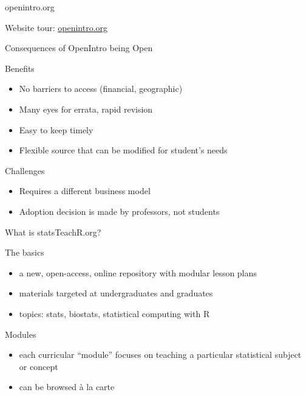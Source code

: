 
\begin{frame}{openintro.org}

Website tour: \href{http://www.openintro.org}{openintro.org}

\end{frame}


\begin{frame}{Consequences of OpenIntro being Open}
\begin{block}{Benefits}
\begin{itemize}
\item No barriers to access (financial, geographic)
\item Many eyes for errata, rapid revision
\item Easy to keep timely
\item Flexible source that can be modified for student's needs
\end{itemize}
\end{block}

\begin{block}{Challenges}
\begin{itemize}
\item Requires a different business model
\item Adoption decision is made by professors, not students
\end{itemize}
\end{block}

\end{frame}



\begin{frame}{What is statsTeachR.org?}

\begin{block}{The basics}
\begin{itemize}
        \item a new, open-access, online repository with modular lesson plans
        \item materials targeted at undergraduates and graduates 
        \item topics: stats, biostats, statistical computing with R
\end{itemize}
\end{block}

\begin{block}{Modules}
\begin{itemize}
        \item each curricular ``module'' focuses on teaching a particular statistical subject or concept
        \item can be browsed \`a la carte
\end{itemize}
\end{block}

\end{frame}

